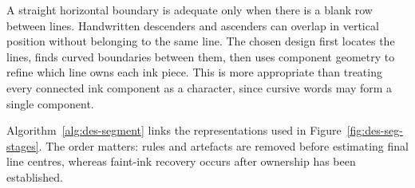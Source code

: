 A straight horizontal boundary is adequate only when there is a blank row between lines. Handwritten descenders and ascenders can overlap in vertical position without belonging to the same line. The chosen design first locates the lines, finds curved boundaries between them, then uses component geometry to refine which line owns each ink piece. This is more appropriate than treating every connected ink component as a character, since cursive words may form a single component.~\cite[segment.py]{braunepipeline2026}

Algorithm~\ref{alg:des-segment} links the representations used in Figure~\ref{fig:des-seg-stages}. The order matters: rules and artefacts are removed before estimating final line centres, whereas faint-ink recovery occurs after ownership has been established.~\cite[segment.py]{braunepipeline2026}


\begin{designalgorithm}
\caption{Photographed page to ordered line crops~\cite{brauneevidence2026,braunepipeline2026}}
\label{alg:des-segment}
\begin{designpseudo}
\end{designpseudo}
\end{designalgorithm}

